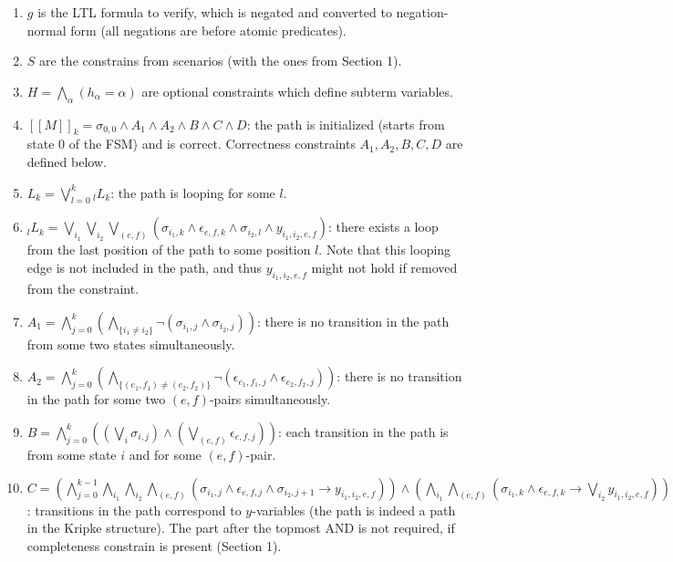 \documentclass[a4paper]{article}
\begin{document}
\begin{enumerate}
\item $g$ is the LTL formula to verify, which is negated and converted to negation-normal form (all negations are before atomic predicates).
\item $S$ are the constrains from scenarios (with the ones from Section 1).
\item $H = \bigwedge_\alpha (h_\alpha = \alpha)$ are optional constraints which define subterm variables.  
\item $[[M]]_k = \sigma_{0, 0} \land A_1 \land A_2 \land B \land C \land D$: the path is initialized (starts from state 0 of the FSM) and is correct. Correctness constraints $A_1, A_2, B, C, D$ are defined below.
\item $L_k = \bigvee\limits_{l = 0}^k {_l} L_k$: the path is looping for some $l$.
\item ${_l} L_k = \bigvee\limits_{i_1} \bigvee\limits_{i_2} \bigvee\limits_{(e, f)} \left( \sigma_{i_1, k} \land \epsilon_{e, f, k} \land \sigma_{i_2, l} \land y_{i_1, i_2, e, f} \right)$: there exists a loop from the last position of the path to some position $l$. Note that this looping edge is not included in the path, and thus $y_{i_1, i_2, e, f}$ might not hold if removed from the constraint.
\item $A_1 = \bigwedge\limits_{j = 0}^k \left( \bigwedge\limits_{\{i_1 \ne i_2\}} \neg \left( \sigma_{i_1, j} \land \sigma_{i_2, j}\right)\right)$: there is no transition in the path from some two states simultaneously.
\item $A_2 = \bigwedge\limits_{j = 0}^k \left( \bigwedge\limits_{\{(e_1, f_1) \ne (e_2, f_2)\}} \neg \left( \epsilon_{e_1, f_1, j} \land \epsilon_{e_2, f_2, j}\right)\right)$: there is no transition in the path for some two $(e, f)$-pairs simultaneously.
\item $B = \bigwedge\limits_{j = 0}^k \left( \left(\bigvee\limits_i \sigma_{i, j}\right) 
\land \left(\bigvee\limits_{(e, f)} \epsilon_{e, f, j}\right) \right)$: each transition in the path is from some state $i$ and for some $(e, f)$-pair.
\item $C = \left( \bigwedge\limits_{j = 0}^{k - 1} \bigwedge\limits_{i_1} \bigwedge\limits_{i_2} \bigwedge\limits_{(e, f)} \left( \sigma_{i_1, j} \land \epsilon_{e, f, j} \land \sigma_{i_2, j + 1} \to y_{i_1, i_2, e, f}\right)\right)\land \left( \bigwedge\limits_{i_1} \bigwedge\limits_{(e, f)} \left( \sigma_{i_1, k} \land \epsilon_{e, f, k} \to \bigvee\limits_{i_2} y_{i_1, i_2, e, f}\right)\right)$: transitions in the path correspond to $y$-variables (the path is indeed a path in the Kripke structure). The part after the topmost AND is not required, if completeness constrain is present (Section 1).

\end{enumerate}
\end{document}
